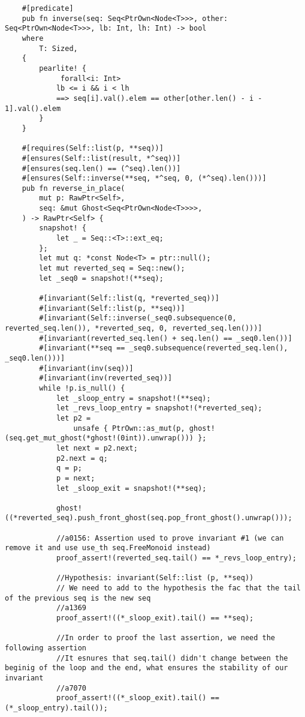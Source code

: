 \begin{verbatim}
    #[predicate]
    pub fn inverse(seq: Seq<PtrOwn<Node<T>>>, other: Seq<PtrOwn<Node<T>>>, lb: Int, lh: Int) -> bool
    where
        T: Sized,
    {
        pearlite! {
             forall<i: Int>
            lb <= i && i < lh
            ==> seq[i].val().elem == other[other.len() - i - 1].val().elem
        }
    }

    #[requires(Self::list(p, **seq))]
    #[ensures(Self::list(result, *^seq))]
    #[ensures(seq.len() == (^seq).len())]
    #[ensures(Self::inverse(**seq, *^seq, 0, (*^seq).len()))]
    pub fn reverse_in_place(
        mut p: RawPtr<Self>,
        seq: &mut Ghost<Seq<PtrOwn<Node<T>>>>,
    ) -> RawPtr<Self> {
        snapshot! {
            let _ = Seq::<T>::ext_eq;
        };
        let mut q: *const Node<T> = ptr::null();
        let mut reverted_seq = Seq::new();
        let _seq0 = snapshot!(**seq);

        #[invariant(Self::list(q, *reverted_seq))]
        #[invariant(Self::list(p, **seq))]
        #[invariant(Self::inverse(_seq0.subsequence(0, reverted_seq.len()), *reverted_seq, 0, reverted_seq.len()))]
        #[invariant(reverted_seq.len() + seq.len() == _seq0.len())]
        #[invariant(**seq == _seq0.subsequence(reverted_seq.len(), _seq0.len()))]
        #[invariant(inv(seq))]
        #[invariant(inv(reverted_seq))]
        while !p.is_null() {
            let _sloop_entry = snapshot!(**seq);
            let _revs_loop_entry = snapshot!(*reverted_seq);
            let p2 =
                unsafe { PtrOwn::as_mut(p, ghost!(seq.get_mut_ghost(*ghost!(0int)).unwrap())) };
            let next = p2.next;
            p2.next = q;
            q = p;
            p = next;
            let _sloop_exit = snapshot!(**seq);

            ghost!((*reverted_seq).push_front_ghost(seq.pop_front_ghost().unwrap()));

            //a0156: Assertion used to prove invariant #1 (we can remove it and use use_th seq.FreeMonoid instead)
            proof_assert!(reverted_seq.tail() == *_revs_loop_entry);

            //Hypothesis: invariant(Self::list (p, **seq))
            // We need to add to the hypothesis the fac that the tail of the previous seq is the new seq
            //a1369
            proof_assert!((*_sloop_exit).tail() == **seq);

            //In order to proof the last assertion, we need the following assertion
            //It esnures that seq.tail() didn't change between the beginig of the loop and the end, what ensures the stability of our invariant
            //a7070
            proof_assert!((*_sloop_exit).tail() == (*_sloop_entry).tail());


\end{verbatim}

